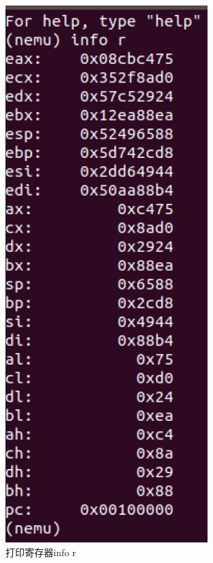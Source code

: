 \documentclass[UTF8,a4paper,10pt]{ctexart}
\begin{document}
{\begin{figure}[H]
        \includegraphics[scale=0.5]{fig/3.png}
        \caption{打印寄存器info r}
    \end{figure}
}
\end{document}
